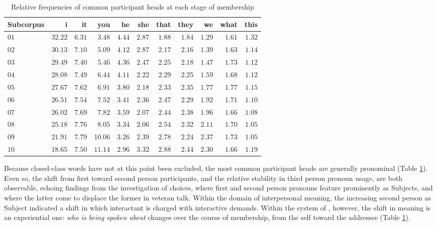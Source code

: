     \begin{table}[htb]
    \centering
    \small
    \begin{tabular}{lrrrrrrrrrr}
    
    \toprule
    Subcorpus &     i &   it &   you &   he &  she &  that &  they &   we &  what &  this \\
    \midrule
    $01$ & $32.22$ & $6.31$ & $ 3.48$ & $4.44$ & $2.87$ &  $1.88$ &  $1.84$ & $1.29$ &  $1.61$ &  $1.32$ \\
    $02$ & $30.13$ & $7.10$ & $ 5.09$ & $4.12$ & $2.87$ &  $2.17$ &  $2.16$ & $1.39$ &  $1.63$ &  $1.14$ \\
    $03$ & $29.49$ & $7.40$ & $ 5.46$ & $4.36$ & $2.47$ &  $2.25$ &  $2.18$ & $1.47$ &  $1.73$ &  $1.12$ \\
    $04$ & $28.08$ & $7.49$ & $ 6.44$ & $4.11$ & $2.22$ &  $2.29$ &  $2.25$ & $1.59$ &  $1.68$ &  $1.12$ \\
    $05$ & $27.67$ & $7.62$ & $ 6.91$ & $3.80$ & $2.18$ &  $2.33$ &  $2.35$ & $1.77$ &  $1.77$ &  $1.15$ \\
    $06$ & $26.51$ & $7.54$ & $ 7.52$ & $3.41$ & $2.36$ &  $2.47$ &  $2.29$ & $1.92$ &  $1.71$ &  $1.10$ \\
    $07$ & $26.02$ & $7.69$ & $ 7.82$ & $3.59$ & $2.07$ &  $2.44$ &  $2.38$ & $1.96$ &  $1.66$ &  $1.08$ \\
    $08$ & $25.18$ & $7.76$ & $ 8.05$ & $3.34$ & $2.06$ &  $2.54$ &  $2.32$ & $2.11$ &  $1.70$ &  $1.05$ \\
    $09$ & $21.91$ & $7.79$ & $10.06$ & $3.26$ & $2.39$ &  $2.78$ &  $2.24$ & $2.37$ &  $1.73$ &  $1.05$ \\
    $10$ & $18.65$ & $7.50$ & $11.14$ & $2.96$ & $3.32$ &  $2.88$ &  $2.44$ & $2.30$ &  $1.66$ &  $1.19$ \\
    \bottomrule
    \end{tabular}
    \caption[Relative frequencies of common participant heads]{Relative frequencies of common participant heads at each stage of membership}
    \label{tab:rel_freq_part_stop}
    \end{table}
%
Because closed\hyp{}class words have not at this point been excluded, the most common participant heads are generally pronominal (Table \ref{tab:rel_freq_part_stop}). Even so, the shift from first toward second person participants, and the relative stability in third person pronoun usage, are both observable, echoing findings from the investigation of  choices, where first and second person pronouns feature prominently as Subjects, and where the latter come to displace the former in veteran talk. Within the domain of interpersonal meaning, the increasing second person as Subject indicated a shift in which interactant is charged with interactive demands. Within the system of , however, the shift in meaning is an experiential one: \emph{who is being spoken about} changes over the course of membership, from the self toward the addressee (Table \ref{tab:rel_freq_part_stop}). 

